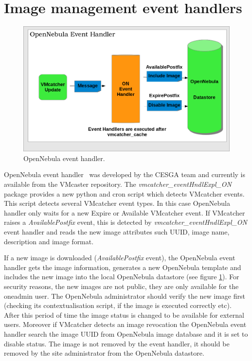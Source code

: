 \documentclass{llncs_Ibergrid2013}
\begin{document}
\section{Image management event handlers}
\label{sect-handlers}
\begin{figure}[h]
\centering
\includegraphics[width=1\textwidth]{ONeventhandler.png}
\caption{OpenNebula event handler.}
\label{fig:onevent}
\end{figure}
OpenNebula event handler~\cite{onevent} was developed by the CESGA team and currently is available from the VMcaster repository. 
The \textit{vmcatcher\_eventHndlExpl\_ON} package provides a new python and cron script which detects VMcatcher events. 
This script detects several VMcatcher event types. In this case OpenNebula handler only waits for a new Expire or Available VMcatcher event.
If VMcatcher raises a \textit{AvailablePostfix} event, this is detected by \textit{vmcatcher\_eventHndlExpl\_ON} event handler and reads the new image attributes such UUID, image name, description and image format.

If a new image is downloaded (\textit{AvailablePostfix} event), the OpenNebula event handler gets the image information, generates a new OpenNebula template and includes the new image into the local OpenNebula datastore (see figure \ref{fig:onevent}). 
For security reasons, the new images are not public, they are only available for the oneadmin user. The OpenNebula administrator should verify the new image first (checking its contextualisation script, if the image is executed correctly etc).
After this period of time the image status is changed to be available for external users. 
Moreover if VMcatcher detects an image revocation the OpenNebula event handler search the image UUID from OpenNebula image database and it is set to disable status.
The image is not removed by the event handler, it should be removed by the site administrator from the OpenNebula datastore.
\end{document}
